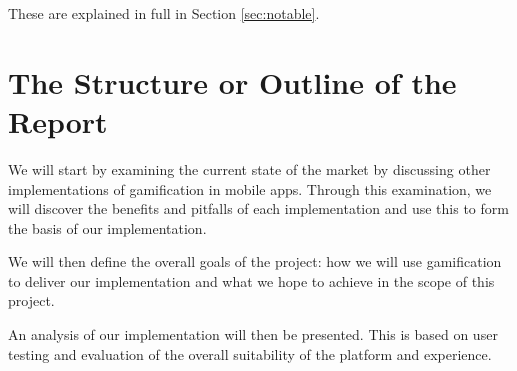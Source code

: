 These are explained in full in Section \ref{sec:notable}.

\section{The Structure or Outline of the Report}

We will start by examining the current state of the market by
discussing other implementations of gamification in mobile
apps. Through this examination, we will discover the benefits and
pitfalls of each implementation and use this to form the basis of our
implementation. 

We will then define the overall goals of the project: how we will use
gamification to deliver our implementation and what we hope to
achieve in the scope of this project. 

An analysis of our implementation will then be presented. This is
based on user testing and evaluation of the overall suitability of
the platform and experience.
